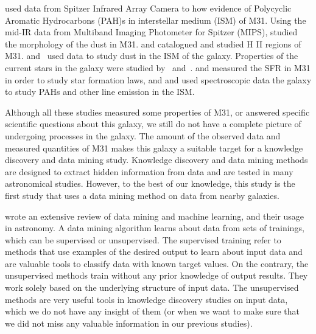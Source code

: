 \cite{Barmby06} used data from Spitzer Infrared Array Camera \citep[IRAC;][]{Fazio04} to how evidence of Polycyclic Aromatic Hydrocarbons (PAH)s in interstellar medium (ISM) of M31.
Using the mid-IR data from Multiband Imaging Photometer for Spitzer (MIPS), \cite{Gordon06} studied the morphology of the dust in M31.
\cite{Azimlu11} and \cite{Sanders12} catalogued and studied H {\sc II} regions of M31.
\cite{Draine14, Mattsson14, Viaene14, Smith12} and~\cite{Fritz12} used \Herschel data to study dust in the ISM of the galaxy.
Properties of the current stars in the galaxy were studied by~\cite{Tamm12} and~\cite{Massey07}. %
\cite{Rahmani16, Ford13} and \cite{Tabatabaei10} measured the SFR in M31 in order to study star formation laws, and \cite{Dim15} and \cite{Kapala15} used spectroscopic data the galaxy to study PAHs and other line emission in the ISM.

Although all these studies measured some properties of M31, or answered specific scientific questions about this galaxy, we still do not have a complete picture of undergoing processes in the galaxy.
The amount of the observed data and measured quantities of M31 makes this galaxy a suitable target for a knowledge discovery and data mining study.
Knowledge discovery and data mining methods are designed to extract hidden information from data and are tested in many astronomical studies.
However, to the best of our knowledge, this study is the first study that uses a data mining method on data from nearby galaxies. %

\cite{Ball10} wrote an extensive review of data mining and machine learning, and their usage in astronomy.
A data mining algorithm learns about data from sets of trainings, which can be supervised or unsupervised.
The supervised training refer to methods that use examples of the desired output to learn about input data and are valuable tools to classify data with known target values.
On the contrary, the unsupervised methods train without any prior knowledge of output results. 
They work solely based on the underlying structure of input data.   
The unsupervised methods are very useful tools in knowledge discovery studies on input data, which we do not have any insight of them (or when we want to make sure that we did not miss any valuable information in our previous studies). %

